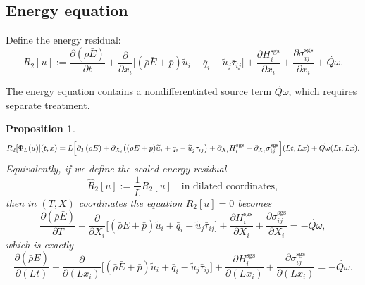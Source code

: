 \documentclass[11pt]{article}
\newtheorem{proposition}[theorem]{Proposition}
\theoremstyle{definition}
\theoremstyle{remark}
\newcommand{\sgs}{\mathrm{sgs}}
\newcommand{\barrho}{\bar{\rho}}
\newcommand{\barp}{\bar{p}}
\newcommand{\barE}{\bar{E}}
\newcommand{\bartau}{\bar{\tau}}
\newcommand{\barq}{\bar{q}}
\newcommand{\tilu}{\widetilde{u}}
\newcommand{\Qdot}{\dot{Q\omega}}
\begin{document}
\subsection{Energy equation}

Define the energy residual:
\[
R_2[u]:=\frac{\partial(\barrho\barE)}{\partial t}
+\frac{\partial}{\partial x_i}\bigl[(\barrho\barE+\barp)\tilu_i
+\barq_i-\tilu_j\bartau_{ij}\bigr]
+\frac{\partial H^{\sgs}_i}{\partial x_i}
+\frac{\partial\sigma^{\sgs}_{ij}}{\partial x_i}+\Qdot .
\]

The energy equation contains a nondifferentiated source term $\Qdot$, which
requires separate treatment.

\begin{proposition}
\label{prop:energy}
\[
R_2[\Phi_L(u)](t,x)
=L\Bigl[\partial_T(\barrho\barE)
+\partial_{X_i}\bigl((\barrho\barE+\barp)\tilu_i+\barq_i
-\tilu_j\bartau_{ij}\bigr)
+\partial_{X_i}H^{\sgs}_i
+\partial_{X_i}\sigma^{\sgs}_{ij}\Bigr](Lt,Lx)
+\Qdot(Lt,Lx).
\]
Equivalently, if we define the \emph{scaled energy residual}
\[
\widehat R_2[u]:=\frac{1}{L}R_2[u]\quad\text{in dilated coordinates},
\]
then in $(T,X)$ coordinates the equation $R_2[u]=0$ becomes
\[
\frac{\partial(\barrho\barE)}{\partial T}
+\frac{\partial}{\partial X_i}\bigl[(\barrho\barE+\barp)\tilu_i
+\barq_i-\tilu_j\bartau_{ij}\bigr]
+\frac{\partial H^{\sgs}_i}{\partial X_i}
+\frac{\partial\sigma^{\sgs}_{ij}}{\partial X_i}
=-\Qdot,
\]
which is exactly
\[
\frac{\partial(\barrho\barE)}{\partial(Lt)}
+\frac{\partial}{\partial(Lx_i)}\bigl[(\barrho\barE+\barp)\tilu_i
+\barq_i-\tilu_j\bartau_{ij}\bigr]
+\frac{\partial H^{\sgs}_i}{\partial(Lx_i)}
+\frac{\partial\sigma^{\sgs}_{ij}}{\partial(Lx_i)}
=-\Qdot.
\]
\end{proposition}
\end{document}
